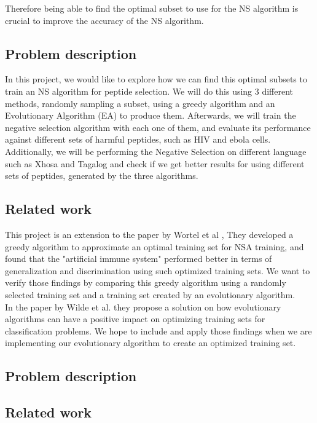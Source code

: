 \documentclass{article}
\begin{document}
Therefore being able to find the optimal subset to use for the NS algorithm is crucial to improve the accuracy of the 
NS algorithm.  

\subsection{Problem description}

In this project, we would like to explore how we can find this optimal subsets to train an NS algorithm for peptide 
selection. We will do this using 3 different methods, randomly sampling a subset, using a greedy algorithm and an 
Evolutionary Algorithm (EA) to produce them. Afterwards, we will train the negative selection algorithm with each one of
them, and evaluate its performance against different sets of harmful peptides, such as HIV and ebola cells. Additionally,
we will be performing the Negative Selection on different language such as Xhosa and Tagalog and check if we get better 
results for using different sets of peptides, generated by the three algorithms. 

\subsection{Related work}
This project is an extension to the paper by Wortel et al \cite{wortel2020t}, They developed a greedy algorithm to 
approximate an optimal training set for NSA training, and found that the "artificial immune system" performed better in 
terms of generalization and discrimination using such optimized training sets. We want to verify those findings by 
comparing this greedy algorithm using a randomly selected training set and a training set created by an evolutionary 
algorithm.\\

In the paper by Wilde et al. \cite{wilde2020evolutionary} they propose a solution on how evolutionary algorithms can 
have a positive impact on optimizing training sets for classification problems.
We hope to include and apply those findings when we are implementing our evolutionary algorithm to create an 
optimized training set.

\subsection{Problem description}

\subsection{Related work}
\end{document}
